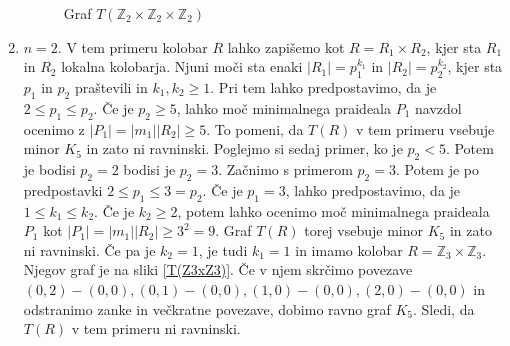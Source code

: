 \documentclass[a4paper, 12pt]{amsart}
\theoremstyle{definition} %
\theoremstyle{plain} %
\newcommand{\Z}{\mathbb Z}
\begin{document}
\begin{enumerate}
\begin{figure}[h!]

\caption{Graf $T(\Z_2\times \Z_2 \times  \Z_2)$}
\label{T(Z2xZ2xZ2)}
\end{figure}

\item $n=2$. V tem primeru kolobar $R$ lahko zapišemo kot $R= R_1 \times R_2$, kjer sta $R_1$ in $R_2$ lokalna kolobarja. Njuni moči sta enaki $|R_1 | = p_1^{k_1}$ in $|R_2| = p_2^{k_2}$, kjer sta $p_1$ in $p_2$ praštevili in $k_1,k_2 \ge 1$. Pri tem lahko predpostavimo, da je $2 \le p_1 \le p_2$. Če je $p_2 \ge 5$, lahko moč minimalnega praideala $P_1$ navzdol ocenimo z $|P_1| = |m_1| |R_2| \ge 5$. To pomeni, da $T(R)$ v tem primeru vsebuje minor $K_5$ in zato ni ravninski. Poglejmo si sedaj primer, ko je $p_2 <5$. Potem je bodisi $p_2=2$ bodisi je $p_2 = 3$. Začnimo s primerom $p_2=3$. Potem je po predpostavki $2 \le p_1 \le 3 = p_2$. Če je $p_1=3$, lahko predpostavimo, da je $1\le k_1 \le k_2$. Če je $k_2\ge 2$, potem lahko ocenimo moč minimalnega praideala $P_1$ kot $|P_1| = |m_1||R_2| \ge 3^2 = 9$. Graf $T(R)$ torej vsebuje minor $K_5$ in zato ni ravninski. Če pa je $k_2=1$, je tudi $k_1=1$ in imamo kolobar $R= \Z_3 \times \Z_3$. Njegov graf je na sliki \ref{T(Z3xZ3)}. Če v njem skrčimo povezave $(0,2)-(0,0), (0,1)-(0,0), (1,0)-(0,0), (2,0)-(0,0)$ in odstranimo zanke in večkratne povezave, dobimo ravno graf $K_5$. Sledi, da $T(R)$ v tem primeru ni ravninski.

\begin{figure}[h!]
\centering
\end{figure}
\end{enumerate}
\end{document}
